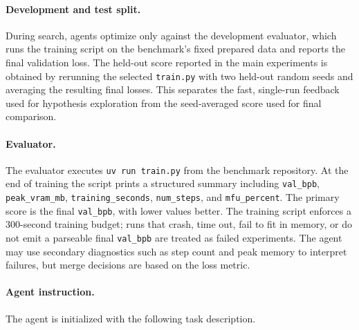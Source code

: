 \paragraph{Development and test split.}
During search, agents optimize only against the development evaluator, which
runs the training script on the benchmark's fixed prepared data and reports the
final validation loss.
The held-out score reported in the main experiments is obtained by rerunning
the selected \texttt{train.py} with two held-out random seeds and averaging the
resulting final losses.
This separates the fast, single-run feedback used for hypothesis exploration
from the seed-averaged score used for final comparison.

\paragraph{Evaluator.}
The evaluator executes
\texttt{uv run train.py} from the benchmark repository.
At the end of training the script prints a structured summary including
\texttt{val\_bpb}, \texttt{peak\_vram\_mb}, \texttt{training\_seconds},
\texttt{num\_steps}, and \texttt{mfu\_percent}.
The primary score is the final \texttt{val\_bpb}, with lower values better.
The training script enforces a 300-second training budget; runs that crash,
time out, fail to fit in memory, or do not emit a parseable final
\texttt{val\_bpb} are treated as failed experiments.
The agent may use secondary diagnostics such as step count and peak memory to
interpret failures, but merge decisions are based on the loss metric.

\paragraph{Agent instruction.}
The agent is initialized with the following task description.

